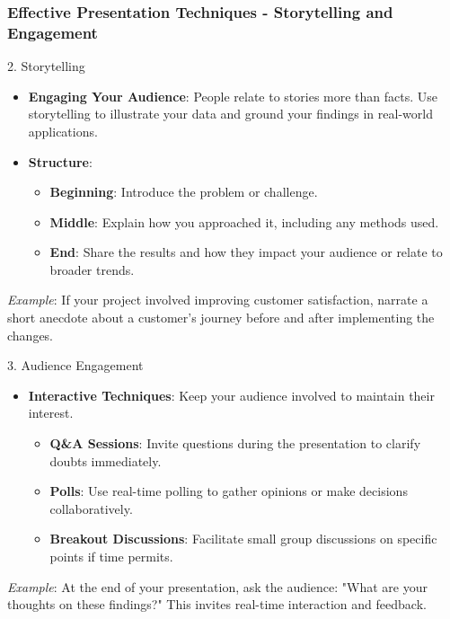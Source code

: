 \documentclass[aspectratio=169]{beamer}
\begin{document}
\begin{frame}[fragile]
    \frametitle{Effective Presentation Techniques - Storytelling and Engagement}
    \begin{block}{2. Storytelling}
        \begin{itemize}
            \item \textbf{Engaging Your Audience}: People relate to stories more than facts. Use storytelling to illustrate your data and ground your findings in real-world applications.
            \item \textbf{Structure}:
            \begin{itemize}
                \item \textbf{Beginning}: Introduce the problem or challenge.
                \item \textbf{Middle}: Explain how you approached it, including any methods used.
                \item \textbf{End}: Share the results and how they impact your audience or relate to broader trends.
            \end{itemize}
        \end{itemize}
        \textit{Example}: If your project involved improving customer satisfaction, narrate a short anecdote about a customer's journey before and after implementing the changes.
    \end{block}

    \begin{block}{3. Audience Engagement}
        \begin{itemize}
            \item \textbf{Interactive Techniques}: Keep your audience involved to maintain their interest. 
            \begin{itemize}
                \item \textbf{Q\&A Sessions}: Invite questions during the presentation to clarify doubts immediately.
                \item \textbf{Polls}: Use real-time polling to gather opinions or make decisions collaboratively.
                \item \textbf{Breakout Discussions}: Facilitate small group discussions on specific points if time permits.
            \end{itemize}
        \end{itemize}
        \textit{Example}: At the end of your presentation, ask the audience: "What are your thoughts on these findings?" This invites real-time interaction and feedback.
    \end{block}
\end{frame}
\end{document}
